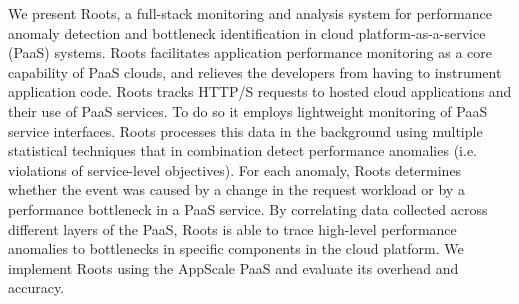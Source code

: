 We present Roots, a full-stack monitoring and analysis system
for performance anomaly detection and bottleneck identification
in cloud platform-as-a-service (PaaS) systems. Roots facilitates
application performance monitoring as a core capability of PaaS clouds, and
relieves the developers from having to instrument application code. Roots tracks 
HTTP/S requests to hosted cloud applications and their use of PaaS services.
To do so it employs lightweight monitoring of PaaS service interfaces.
Roots processes this data in the background using multiple
statistical techniques that in combination detect performance
anomalies (i.e. violations of service-level objectives). For each anomaly,
Roots determines whether the event was caused by a change in
the request workload or by a performance bottleneck in a PaaS service. By
correlating data collected across different layers of the PaaS, Roots is able
to trace high-level performance anomalies to bottlenecks in specific components
in the cloud platform.
We implement Roots using the AppScale PaaS and evaluate its overhead
and accuracy.



